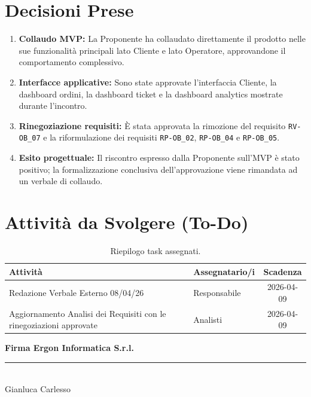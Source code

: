 \documentclass[a4paper, 11pt, oneside]{scrartcl}
\begin{document}
\newpage
\section{Decisioni Prese}

\begin{enumerate}
\item \textbf{Collaudo MVP:} La Proponente ha collaudato direttamente il prodotto nelle sue funzionalità principali lato Cliente e lato Operatore, approvandone il comportamento complessivo.
\item \textbf{Interfacce applicative:} Sono state approvate l'interfaccia Cliente, la dashboard ordini, la dashboard ticket e la dashboard analytics mostrate durante l'incontro.
\item \textbf{Rinegoziazione requisiti:} È stata approvata la rimozione del requisito \texttt{RV-OB\_07} e la riformulazione dei requisiti \texttt{RP-OB\_02}, \texttt{RP-OB\_04} e \texttt{RP-OB\_05}.
\item \textbf{Esito progettuale:} Il riscontro espresso dalla Proponente sull'MVP è stato positivo; la formalizzazione conclusiva dell'approvazione viene rimandata ad un verbale di collaudo.
\end{enumerate}

\newpage
\section{Attività da Svolgere (To-Do)}

\begin{table}[h!]
\centering
\begin{tabularx}{\textwidth}{@{}X l c@{}}
\toprule
\textbf{Attività} & \textbf{Assegnatario/i} & \textbf{Scadenza} \\
\midrule
Redazione Verbale Esterno 08/04/26 & Responsabile & 2026-04-09 \\
\addlinespace
Aggiornamento Analisi dei Requisiti con le rinegoziazioni approvate & Analisti & 2026-04-09 \\
\bottomrule
\end{tabularx}
\caption{Riepilogo task assegnati.}
\end{table}

\vspace{2cm}
\begin{flushright}
	\textbf{Firma Ergon Informatica S.r.l.} \\[0.5cm]

	\vspace{3cm}
	\rule{6cm}{0.4pt} \\
	\small{Gianluca Carlesso}
\end{flushright}
\end{document}

